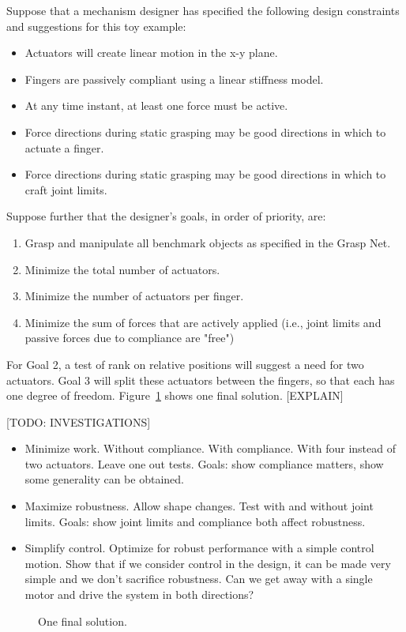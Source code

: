 Suppose that a mechanism designer has specified the following design constraints and suggestions for this toy example:
\begin{itemize}
   \item Actuators will create linear motion in the x-y plane.
   \item Fingers are passively compliant using a linear stiffness model.
   \item At any time instant, at least one force must be active.
   \item Force directions during static grasping may be good directions in which to actuate a finger.
   \item Force directions during static grasping may be good directions in which to craft joint limits.
\end{itemize}
Suppose further that the designer's goals, in order of priority, are:
\begin{enumerate}
	\item Grasp and manipulate all benchmark objects as specified in the Grasp Net.
	\item Minimize the total number of actuators.
	\item Minimize the number of actuators per finger.
	\item Minimize the sum of forces that are actively applied (i.e., joint limits and passive forces due to compliance are "free")
\end{enumerate}

For Goal 2, a test of rank on relative positions will suggest a need for two actuators.  Goal 3 will split these actuators between the fingers, so that each has one degree of freedom.  Figure~\ref{SimpleExampleResults} shows one final solution.  [EXPLAIN]

[TODO:  INVESTIGATIONS]
\begin{itemize}
   \item Minimize work.   Without compliance.   With compliance.   With four instead of two actuators.   Leave one out tests.   Goals:   show compliance matters, show some generality can be obtained.
   \item Maximize robustness.   Allow shape changes.   Test with and without joint limits.   Goals:   show joint limits and compliance both affect robustness.
   \item Simplify control.   Optimize for robust performance with a simple control motion.   Show that if we consider control in the design, it can be made very simple and we don't sacrifice robustness.   Can we get away with a single motor and drive the system in both directions?
\end{itemize}

\begin{figure}
\begin{center}
\vspace*{2in}
\end{center}
\caption[]{One final solution.}
\label{SimpleExampleResults}
\end{figure}


